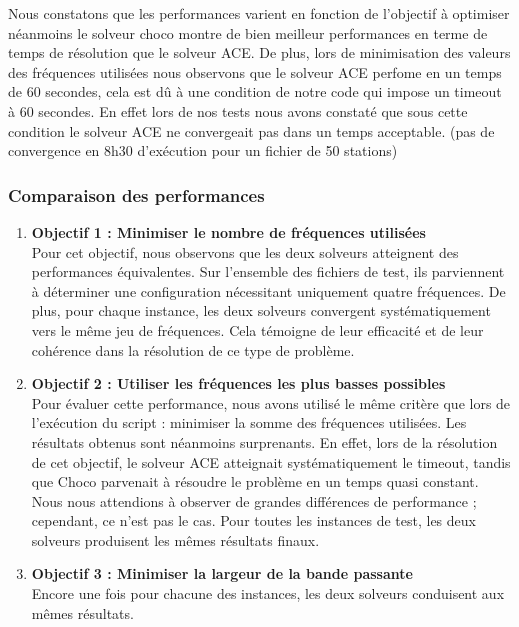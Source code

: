 \documentclass[12pt]{article}
\begin{document}
Nous constatons que les performances varient en fonction de l'objectif à optimiser néanmoins le solveur choco montre de bien meilleur
performances en terme de temps de résolution que le solveur ACE. De plus, lors de minimisation des valeurs des fréquences utilisées 
nous observons que le solveur ACE perfome en un temps de 60 secondes, cela est dû à une condition de notre code qui impose un timeout à 60 secondes.
En effet lors de nos tests nous avons constaté que sous cette condition le solveur ACE ne convergeait pas dans un temps acceptable. (pas de convergence en 8h30 d'exécution
pour un fichier de 50 stations)

\subsubsection{Comparaison des performances}
\begin{enumerate}
    \item \textbf{Objectif 1 : Minimiser le nombre de fréquences utilisées} \\
    Pour cet objectif, nous observons que les deux solveurs atteignent des performances équivalentes. 
    Sur l’ensemble des fichiers de test, ils parviennent à déterminer une configuration nécessitant uniquement 
    quatre fréquences. De plus, pour chaque instance, les deux solveurs convergent systématiquement vers le même 
    jeu de fréquences. Cela témoigne de leur efficacité et de leur cohérence dans la résolution de ce type de problème.
    \item \textbf{Objectif 2 : Utiliser les fréquences les plus basses possibles} \\
    Pour évaluer cette performance, nous avons utilisé le même critère que lors de l’exécution du script : 
    minimiser la somme des fréquences utilisées. Les résultats obtenus sont néanmoins surprenants. En effet, 
    lors de la résolution de cet objectif, le solveur ACE atteignait systématiquement le timeout, tandis que Choco 
    parvenait à résoudre le problème en un temps quasi constant. Nous nous attendions à observer de grandes différences 
    de performance ; cependant, ce n’est pas le cas. Pour toutes les instances de test, les deux solveurs produisent les mêmes résultats finaux.
    \item \textbf{Objectif 3 : Minimiser la largeur de la bande passante} \\
    Encore une fois pour chacune des instances, les deux solveurs conduisent aux mêmes résultats.
\end{enumerate}
\end{document}
